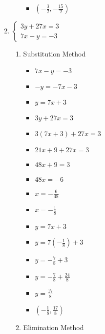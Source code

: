 \documentclass{article}
\begin{document}
\begin{enumerate}
\begin{enumerate}
\begin{itemize}
    \item {\Large $\left(-\frac{3}{2},-\frac{15}{2}\right)$}
    \end{itemize}
  \end{enumerate}
\item $\left\{ \begin{array}{l}
      3y+27x=3 \\
      7x-y=-3 \end{array} \right.$
  \begin{enumerate}
  \item Substitution Method
    \begin{itemize}
    \item $7x-y=-3$
    \item $-y=-7x-3$
    \item $y=7x+3$
    \item $3y+27x=3$
    \item $3(7x+3)+27x=3$
    \item $21x+9+27x=3$
    \item $48x+9=3$
    \item $48x=-6$
    \item {\Large $x=-\frac{6}{48}$}
    \item {\Large $x=-\frac{1}{8}$}
    \item $y=7x+3$
    \item {\Large $y=7\left(-\frac{1}{8}\right)+3$}
    \item {\Large $y=-\frac{7}{8}+3$}
    \item {\Large $y=-\frac{7}{8}+\frac{24}{8}$}
    \item {\Large $y=\frac{17}{8}$}
    \item {\Large $\left(-\frac{1}{8},\frac{17}{8}\right)$}
    \end{itemize}
  \item Elimination Method
\end{enumerate}
\end{enumerate}
\end{document}
